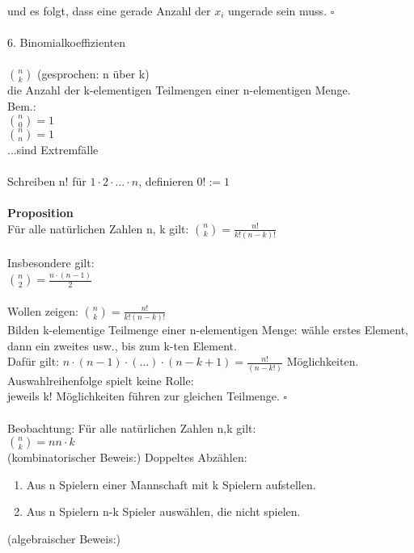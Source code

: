 \documentclass{scrartcl}\usepackage[utf8]{inputenc}
\begin{document}
und es folgt, dass eine gerade Anzahl der $x_i$ ungerade sein muss. $\square$ \\
\\
\Large 6. Binomialkoeffizienten \\
\\
\normalsize
$\binom{n}{k}$ (gesprochen: n \"uber k)\\
die Anzahl der k-elementigen Teilmengen einer n-elementigen Menge.\\
Bem.: \\
$\binom{n}{0} =1$\\
$\binom{n}{n}=1$\\ 
...sind Extremf\"alle\\
\\
Schreiben n! f\"ur $1 \cdot 2 \cdot ... \cdot n$, definieren $0! := 1$\\
\\
\textbf{Proposition}\\
F\"ur alle nat\"urlichen Zahlen n, k gilt: 
$\binom{n}{k} = \frac{n!}{k!(n-k)!}$\\
\\
Insbesondere gilt:\\
$\binom{n}{2} = \frac{n \cdot (n-1) }{2}$\\
\\
Wollen zeigen: $\binom{n}{k} = \frac{n!}{k!(n-k)!}$\\
Bilden k-elementige Teilmenge einer n-elementigen Menge: w\"ahle erstes Element, dann ein zweites usw., bis zum k-ten Element.\\
Daf\"ur gilt: $n \cdot (n-1) \cdot (...) \cdot (n-k+1) = \frac {n!}{(n-k!)}$ M\"oglichkeiten.\\
Auswahlreihenfolge spielt keine Rolle:\\
jeweils k! M\"oglichkeiten f\"uhren zur gleichen Teilmenge. $\square $\\
\\
Beobachtung: F\"ur alle nat\"urlichen Zahlen n,k gilt:\\
$\binom{n}{k}={n}{n \cdot k}$\\
(kombinatorischer Beweis:) Doppeltes Abz\"ahlen:\\
  \begin{enumerate}
    	\item Aus n Spielern einer Mannschaft mit k Spielern aufstellen.
    	\item Aus n Spielern n-k Spieler ausw\"ahlen, die nicht spielen.
    \end{enumerate}
(algebraischer Beweis:)\\
\end{document}
